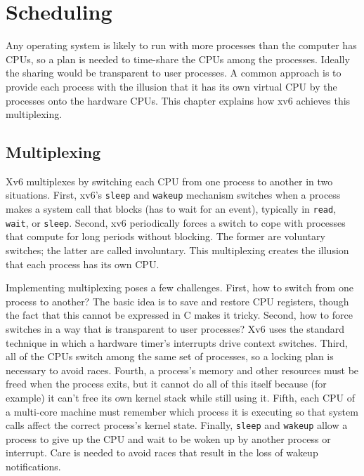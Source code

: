 % 
%  
\chapter{Scheduling}
\label{CH:SCHED}

Any operating system is likely to run with more processes than the
computer has CPUs, so a plan is needed to time-share the
CPUs among the processes. Ideally the sharing would be transparent to user
processes.  A common approach is to provide each process
with the illusion that it has its own virtual CPU by
the processes onto the hardware CPUs.
This chapter explains how xv6 achieves this multiplexing.
\section{Multiplexing}

Xv6 multiplexes by switching each CPU from one process to
another in two situations. First, xv6's
\lstinline{sleep}
and
\lstinline{wakeup}
mechanism switches when a process makes a system
call that blocks (has to wait for an event), typically in \lstinline{read},
\lstinline{wait},
or
\lstinline{sleep}.
Second, xv6 periodically forces a switch to cope with
processes that compute for long periods without blocking.
The former are voluntary switches;
the latter are called involuntary.
This multiplexing creates the illusion that
each process has its own CPU.

Implementing multiplexing poses a few challenges. First, how to switch from one
process to another? 
The basic idea is to save and restore CPU registers,
though the fact that this cannot be expressed in C makes it tricky.
Second, how to force
switches in a way that is transparent to user processes?  Xv6 uses the
standard technique in which a hardware timer's interrupts drive context switches.
Third, all of the CPUs switch among the same set of processes, so a
locking plan is necessary to avoid races. Fourth, a process's
memory and other resources must be freed when the process exits,
but it cannot do all of this itself
because (for example) it can't free its own kernel stack while still using it.
Fifth, each CPU of a multi-core machine must remember which
process it is executing so that system calls affect the correct
process's kernel state.
Finally,  \lstinline{sleep} and \lstinline{wakeup} allow a process to give up
the CPU and wait to be woken up by another process or interrupt.
Care is needed to avoid races that result in
the loss of wakeup notifications.


